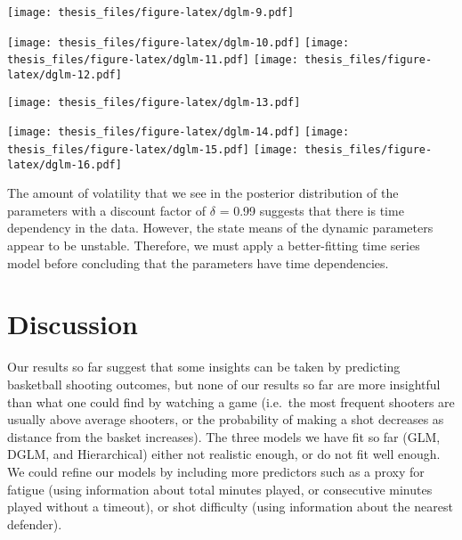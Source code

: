 \documentclass[12pt,twoside]{dukestatscithesis}
\theoremstyle{definition}
\theoremstyle{definition}
\theoremstyle{definition}
\theoremstyle{remark}
\begin{document}
\texttt{[image: thesis\_files/figure-latex/dglm-9.pdf]}
\begin{Shaded}
\begin{Highlighting}[]
\NormalTok{(dglm3[[}\NormalTok{]])}
\end{Highlighting}
\end{Shaded}
\texttt{[image: thesis\_files/figure-latex/dglm-10.pdf]}
\texttt{[image: thesis\_files/figure-latex/dglm-11.pdf]}
\texttt{[image: thesis\_files/figure-latex/dglm-12.pdf]}
\begin{Shaded}
\begin{Highlighting}[]
\NormalTok{(dglm4[[}\NormalTok{]])}
\end{Highlighting}
\end{Shaded}
\texttt{[image: thesis\_files/figure-latex/dglm-13.pdf]}
\begin{Shaded}
\begin{Highlighting}[]
\NormalTok{(dglm4[[}\NormalTok{]])}
\end{Highlighting}
\end{Shaded}
\texttt{[image: thesis\_files/figure-latex/dglm-14.pdf]}
\texttt{[image: thesis\_files/figure-latex/dglm-15.pdf]}
\texttt{[image: thesis\_files/figure-latex/dglm-16.pdf]}

The amount of volatility that we see in the posterior distribution of
the parameters with a discount factor of \(\delta\) = 0.99 suggests that
there is time dependency in the data. However, the state means of the
dynamic parameters appear to be unstable. Therefore, we must apply a
better-fitting time series model before concluding that the parameters
have time dependencies.

\chapter{Discussion}\label{disc}

Our results so far suggest that some insights can be taken by predicting
basketball shooting outcomes, but none of our results so far are more
insightful than what one could find by watching a game (i.e.~the most
frequent shooters are usually above average shooters, or the probability
of making a shot decreases as distance from the basket increases). The
three models we have fit so far (GLM, DGLM, and Hierarchical) either not
realistic enough, or do not fit well enough. We could refine our models
by including more predictors such as a proxy for fatigue (using
information about total minutes played, or consecutive minutes played
without a timeout), or shot difficulty (using information about the
nearest defender).
\end{document}
